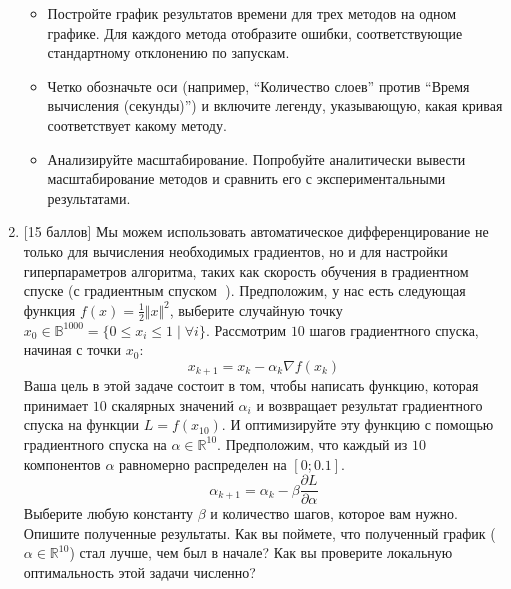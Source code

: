 \documentclass[
  russian,
  letterpaper,
  DIV=11,
  numbers=noendperiod]{scrartcl}
\providecommand{\tightlist}{%
  \setlength{\itemsep}{0pt}\setlength{\parskip}{0pt}}
\begin{document}
\begin{enumerate}
  \begin{itemize}
  \tightlist
  \item
    Постройте график результатов времени для трех методов на одном
    графике. Для каждого метода отобразите ошибки, соответствующие
    стандартному отклонению по запускам.
  \item
    Четко обозначьте оси (например, ``Количество слоев'' против ``Время
    вычисления (секунды)'') и включите легенду, указывающую, какая
    кривая соответствует какому методу.
  \item
    Анализируйте масштабирование. Попробуйте аналитически вывести
    масштабирование методов и сравнить его с экспериментальными
    результатами.
  \end{itemize}
\item
  {[}15 баллов{]} Мы можем использовать автоматическое дифференцирование
  не только для вычисления необходимых градиентов, но и для настройки
  гиперпараметров алгоритма, таких как скорость обучения в градиентном
  спуске (с градиентным спуском 🤯). Предположим, у нас есть следующая
  функция \(f(x) = \frac{1}{2}\Vert x\Vert^2\), выберите случайную точку
  \(x_0 \in \mathbb{B}^{1000} = \{0 \leq x_i \leq 1 \mid \forall i\}\).
  Рассмотрим \(10\) шагов градиентного спуска, начиная с точки \(x_0\):
  \[
   x_{k+1} = x_k - \alpha_k \nabla f(x_k)
   \] Ваша цель в этой задаче состоит в том, чтобы написать функцию,
  которая принимает \(10\) скалярных значений \(\alpha_i\) и возвращает
  результат градиентного спуска на функции \(L = f(x_{10})\). И
  оптимизируйте эту функцию с помощью градиентного спуска на
  \(\alpha \in \mathbb{R}^{10}\). Предположим, что каждый из \(10\)
  компонентов \(\alpha\) равномерно распределен на \([0; 0.1]\). \[
   \alpha_{k+1} = \alpha_k - \beta \frac{\partial L}{\partial \alpha}
   \] Выберите любую константу \(\beta\) и количество шагов, которое вам
  нужно. Опишите полученные результаты. Как вы поймете, что полученный
  график (\(\alpha \in \mathbb{R}^{10}\)) стал лучше, чем был в начале?
  Как вы проверите локальную оптимальность этой задачи численно?
\end{enumerate}
\end{document}

